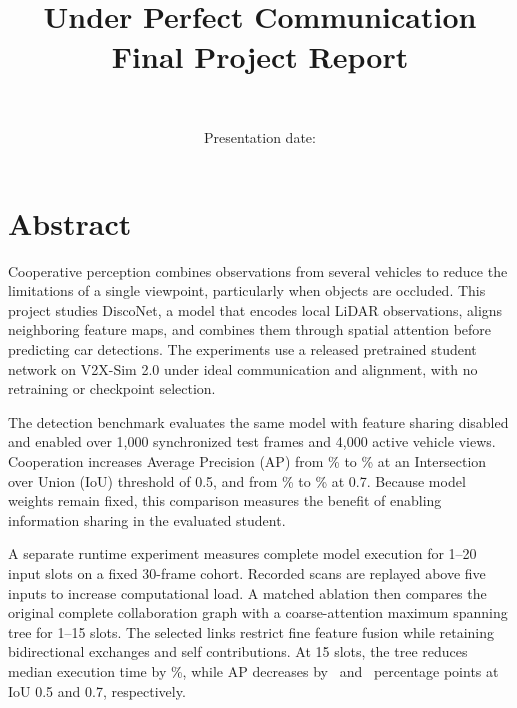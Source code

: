 \documentclass[11pt,a4paper]{article}
\title{\ProjectTitle\\Under Perfect Communication\\[0.6em]\large Final Project Report}
\author{\ProjectAuthor\\\ProjectCourse}
\date{Presentation date: \FinalPresentationDate}
\newcommand{\cleartorecto}{%
  \clearpage
  \ifodd\value{page}\else
    \hbox{}\thispagestyle{empty}\newpage
  \fi}
\begin{document}
\hypersetup{pageanchor=false}
\pagestyle{empty}

\cleartorecto

\cleartorecto
{}
\pagestyle{plain}
\hypersetup{pageanchor=true}
\begingroup
\fontsize{11}{16}\selectfont
\setlength{\parindent}{0pt}
\setlength{\parskip}{10pt}
\section*{Abstract}
Cooperative perception combines observations from several vehicles to reduce
the limitations of a single viewpoint, particularly when objects are occluded.
This project studies DiscoNet, a model that encodes local LiDAR observations,
aligns neighboring feature maps, and combines them through spatial attention
before predicting car detections. The experiments use a released pretrained
student network on V2X-Sim 2.0 under ideal communication and alignment, with no
retraining or checkpoint selection.

The detection benchmark evaluates the same model with feature sharing
disabled and enabled over 1,000 synchronized test frames and 4,000 active
vehicle views. Cooperation increases Average Precision (AP) from
\ReportOwnAPFifty\% to \ReportCoopAPFifty\% at an Intersection over Union (IoU)
threshold of 0.5, and from \ReportOwnAPSeventy\% to \ReportCoopAPSeventy\% at 0.7.
Because model weights remain fixed, this comparison measures the benefit of
enabling information sharing in the evaluated student.

A separate runtime experiment measures complete model execution for 1--20
input slots on a fixed 30-frame cohort. Recorded scans are replayed above
five inputs to increase computational load. A matched ablation then compares
the original complete collaboration graph with a coarse-attention maximum
spanning tree for 1--15 slots. The selected links restrict fine feature
fusion while retaining bidirectional exchanges and self contributions.
At 15 slots, the tree reduces median execution time by
\ReportTreeReduction\%, while AP decreases by \ReportTreeDropFifty\ and
\ReportTreeDropSeventy\ percentage points at IoU 0.5 and 0.7, respectively.
\end{document}
